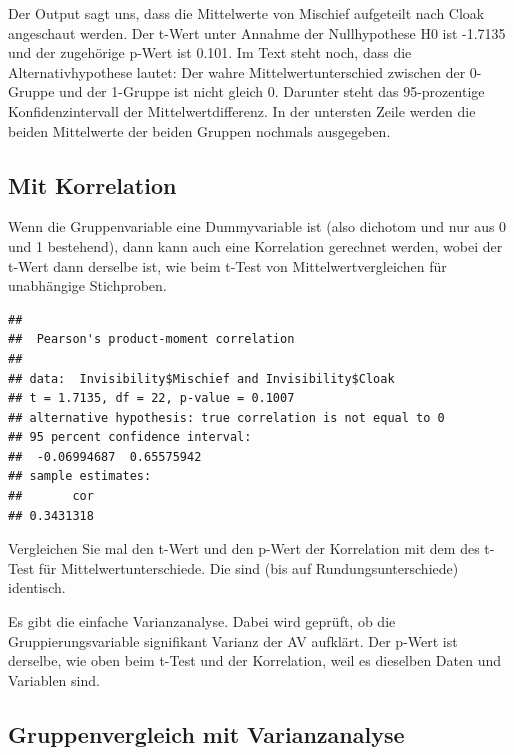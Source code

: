 \documentclass[
  10pt,
  letterpaper,
  a4paper, twoside]{scrreprt}
\begin{document}
Der Output sagt uns, dass die Mittelwerte von Mischief aufgeteilt nach
Cloak angeschaut werden. Der t-Wert unter Annahme der Nullhypothese H0
ist -1.7135 und der zugehörige p-Wert ist 0.101. Im Text steht noch,
dass die Alternativhypothese lautet: Der wahre Mittelwertunterschied
zwischen der 0-Gruppe und der 1-Gruppe ist nicht gleich 0. Darunter
steht das 95-prozentige Konfidenzintervall der Mittelwertdifferenz. In
der untersten Zeile werden die beiden Mittelwerte der beiden Gruppen
nochmals ausgegeben.

\subsection{Mit Korrelation}\label{mit-korrelation}

Wenn die Gruppenvariable eine Dummyvariable ist (also dichotom und nur
aus 0 und 1 bestehend), dann kann auch eine Korrelation gerechnet
werden, wobei der t-Wert dann derselbe ist, wie beim t-Test von
Mittelwertvergleichen für unabhängige Stichproben.

\begin{verbatim}
## 
##  Pearson's product-moment correlation
## 
## data:  Invisibility$Mischief and Invisibility$Cloak
## t = 1.7135, df = 22, p-value = 0.1007
## alternative hypothesis: true correlation is not equal to 0
## 95 percent confidence interval:
##  -0.06994687  0.65575942
## sample estimates:
##       cor 
## 0.3431318
\end{verbatim}

Vergleichen Sie mal den t-Wert und den p-Wert der Korrelation mit dem
des t-Test für Mittelwertunterschiede. Die sind (bis auf
Rundungsunterschiede) identisch.

Es gibt die einfache Varianzanalyse. Dabei wird geprüft, ob die
Gruppierungsvariable signifikant Varianz der AV aufklärt. Der p-Wert ist
derselbe, wie oben beim t-Test und der Korrelation, weil es dieselben
Daten und Variablen sind.

\subsection{Gruppenvergleich mit
Varianzanalyse}\label{gruppenvergleich-mit-varianzanalyse}
\end{document}
